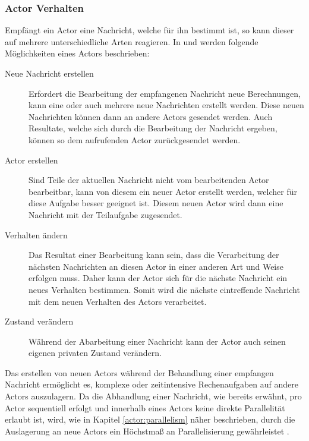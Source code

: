 \subsubsection{Actor Verhalten}
\label{actorBehaviour}
Empfängt ein Actor eine Nachricht, welche für ihn bestimmt ist, so kann dieser auf mehrere unterschiedliche Arten reagieren. In \citep{Agha1985ActorsSystems} und \citep{Vernon2015ReactiveAkka} werden folgende Möglichkeiten eines Actors beschrieben:
\begin{description}
  \item[Neue Nachricht erstellen] Erfordert die Bearbeitung der empfangenen Nachricht neue Berechnungen, kann eine oder auch mehrere neue Nachrichten erstellt werden. Diese neuen Nachrichten können dann an andere Actors gesendet werden. Auch Resultate, welche sich durch die Bearbeitung der Nachricht ergeben, können so dem aufrufenden Actor zurückgesendet werden.
  \item[Actor erstellen] Sind Teile der aktuellen Nachricht nicht vom bearbeitenden Actor bearbeitbar, kann von diesem ein neuer Actor erstellt werden, welcher für diese Aufgabe besser geeignet ist. Diesem neuen Actor wird dann eine Nachricht mit der Teilaufgabe zugesendet.
  \item[Verhalten ändern] Das Resultat einer Bearbeitung kann sein, dass die Verarbeitung der nächsten Nachrichten an diesen Actor in einer anderen Art und Weise erfolgen muss. Daher kann der Actor sich für die nächste Nachricht ein neues Verhalten bestimmen. Somit wird die nächste eintreffende Nachricht mit dem neuen Verhalten des Actors verarbeitet.
  \item[Zustand verändern] Während der Abarbeitung einer Nachricht kann der Actor auch seinen eigenen privaten Zustand verändern.
\end{description}
Das erstellen von neuen Actors während der Behandlung einer empfangen Nachricht ermöglicht es, komplexe oder zeitintensive Rechenaufgaben auf andere Actors auszulagern. Da die Abhandlung einer Nachricht, wie bereits erwähnt, pro Actor sequentiell erfolgt und innerhalb eines Actors keine direkte Parallelität erlaubt ist, wird, wie in Kapitel \ref{actor:parallelism} näher beschrieben, durch die Auslagerung an neue Actors ein Höchstmaß an Parallelisierung gewährleistet \citep{Agha1985ConcurrentParallelism}.

